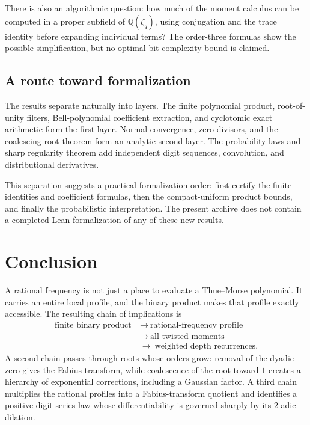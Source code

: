 \documentclass[11pt,letterpaper]{article}
\numberwithin{equation}{section}
\theoremstyle{definition}
\theoremstyle{remark}
\newcommand{\Q}{\mathbb Q}
\begin{document}
There is also an algorithmic question: how much of the moment calculus can be computed in a proper subfield of \(\Q(\zeta_q)\), using conjugation and the trace identity before expanding individual terms? The order-three formulas show the possible simplification, but no optimal bit-complexity bound is claimed.

\subsection{A route toward formalization}
The results separate naturally into layers. The finite polynomial product, root-of-unity filters, Bell-polynomial coefficient extraction, and cyclotomic exact arithmetic form the first layer. Normal convergence, zero divisors, and the coalescing-root theorem form an analytic second layer. The probability laws and sharp regularity theorem add independent digit sequences, convolution, and distributional derivatives.

This separation suggests a practical formalization order: first certify the finite identities and coefficient formulas, then the compact-uniform product bounds, and finally the probabilistic interpretation. The present archive does not contain a completed Lean formalization of any of these new results.

\section{Conclusion}
A rational frequency is not just a place to evaluate a Thue--Morse polynomial. It carries an entire local profile, and the binary product makes that profile exactly accessible. The resulting chain of implications is
\[
\begin{aligned}
 \text{finite binary product}
 &\ \longrightarrow\ \text{rational-frequency profile}\\
 &\ \longrightarrow\ \text{all twisted moments}\\
 &\ \longrightarrow\ \text{weighted depth recurrences}.
\end{aligned}
\]
A second chain passes through roots whose orders grow: removal of the dyadic zero gives the Fabius transform, while coalescence of the root toward \(1\) creates a hierarchy of exponential corrections, including a Gaussian factor. A third chain multiplies the rational profiles into a Fabius-transform quotient and identifies a positive digit-series law whose differentiability is governed sharply by its 2-adic dilation.
\end{document}
